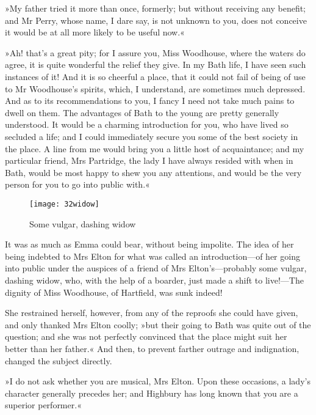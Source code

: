 »My father tried it more than once, formerly; but without receiving any benefit; and Mr Perry, whose name, I dare say, is not unknown to you, does not conceive it would be at all more likely to be useful now.«

»Ah! that's a great pity; for I assure you, Miss Woodhouse, where the waters do agree, it is quite wonderful the relief they give. In my Bath life, I have seen such instances of it! And it is so cheerful a place, that it could not fail of being of use to Mr Woodhouse's spirits, which, I understand, are sometimes much depressed. And as to its recommendations to you, I fancy I need not take much pains to dwell on them. The advantages of Bath to the young are pretty generally understood. It would be a charming introduction for you, who have lived so secluded a life; and I could immediately secure you some of the best society in the place. A line from me would bring you a little host of acquaintance; and my particular friend, Mrs Partridge, the lady I have always resided with when in Bath, would be most happy to shew you any attentions, and would be the very person for you to go into public with.«

\begin{figure}[tbph]
\centering
\texttt{[image: 32widow]}
\caption{Some vulgar, dashing widow}
\end{figure}

It was as much as Emma could bear, without being impolite. The idea of her being indebted to Mrs Elton for what was called an introduction—of her going into public under the auspices of a friend of Mrs Elton's—probably some vulgar, dashing widow, who, with the help of a boarder, just made a shift to live!—The dignity of Miss Woodhouse, of Hartfield, was sunk indeed!

She restrained herself, however, from any of the reproofs she could have given, and only thanked Mrs Elton coolly; »but their going to Bath was quite out of the question; and she was not perfectly convinced that the place might suit her better than her father.« And then, to prevent farther outrage and indignation, changed the subject directly.

»I do not ask whether you are musical, Mrs Elton. Upon these occasions, a lady's character generally precedes her; and Highbury has long known that you are a superior performer.«

